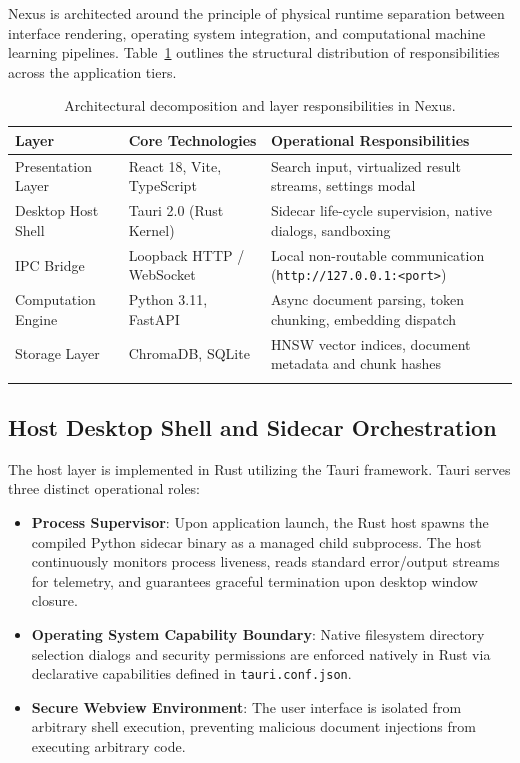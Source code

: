 \documentclass[pdflatex,sn-mathphys-num]{sn-jnl}%
\theoremstyle{thmstyleone}%
\theoremstyle{thmstyletwo}%
\theoremstyle{thmstylethree}%
\begin{document}
Nexus is architected around the principle of physical runtime separation between interface rendering, operating system integration, and computational machine learning pipelines. Table~\ref{tab_arch} outlines the structural distribution of responsibilities across the application tiers.

\begin{table}[h]
\caption{Architectural decomposition and layer responsibilities in Nexus.}\label{tab_arch}
\begin{tabular*}{\textwidth}{@{\extracolsep\fill}lll@{}}
\toprule
\textbf{Layer} & \textbf{Core Technologies} & \textbf{Operational Responsibilities} \\
\midrule
Presentation Layer & React 18, Vite, TypeScript & Search input, virtualized result streams, settings modal \\
Desktop Host Shell & Tauri 2.0 (Rust Kernel) & Sidecar life-cycle supervision, native dialogs, sandboxing \\
IPC Bridge & Loopback HTTP / WebSocket & Local non-routable communication (\texttt{http://127.0.0.1:<port>}) \\
Computation Engine & Python 3.11, FastAPI & Async document parsing, token chunking, embedding dispatch \\
Storage Layer & ChromaDB, SQLite & HNSW vector indices, document metadata and chunk hashes \\
\botrule
\end{tabular*}
\end{table}

\subsection{Host Desktop Shell and Sidecar Orchestration}\label{subsec3_1}
The host layer is implemented in Rust utilizing the Tauri framework. Tauri serves three distinct operational roles:
\begin{itemize}
    \item \textbf{Process Supervisor}: Upon application launch, the Rust host spawns the compiled Python sidecar binary as a managed child subprocess. The host continuously monitors process liveness, reads standard error/output streams for telemetry, and guarantees graceful termination upon desktop window closure.
    \item \textbf{Operating System Capability Boundary}: Native filesystem directory selection dialogs and security permissions are enforced natively in Rust via declarative capabilities defined in \texttt{tauri.conf.json}.
    \item \textbf{Secure Webview Environment}: The user interface is isolated from arbitrary shell execution, preventing malicious document injections from executing arbitrary code.
\end{itemize}
\end{document}
